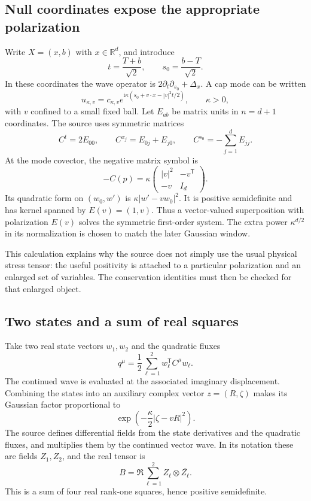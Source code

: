 \documentclass[11pt,a4paper]{article}
\numberwithin{equation}{section}
\theoremstyle{definition}
\theoremstyle{remark}
\newcommand{\R}{\mathbb R}
\begin{document}
\subsection{Null coordinates expose the appropriate polarization}
Write $X=(x,b)$ with $x\in\R^d$, and introduce
\[
 t=\frac{T+b}{\sqrt2},\qquad s_0=\frac{b-T}{\sqrt2}.
\]
In these coordinates the wave operator is
$2\partial_t\partial_{s_0}+\Delta_x$. A cap mode can be written
\[
 u_{\kappa,v}=c_{\kappa,v}
   e^{\mathrm i\kappa(s_0+v\cdot x-|v|^2t/2)},
 \qquad \kappa>0,
\]
with $v$ confined to a small fixed ball. Let $E_{ab}$ be matrix units in
$n=d+1$ coordinates. The source uses symmetric matrices
\[
 C^t=2E_{00},\qquad C^{x_j}=E_{0j}+E_{j0},\qquad
 C^{s_0}=-\sum_{j=1}^dE_{jj}.
\]
At the mode covector, the negative matrix symbol is
\begin{equation}\label{eq:symbol}
 -C(p)=\kappa
 \begin{pmatrix}|v|^2&-v^{\mathsf T}\\-v&I_d\end{pmatrix}.
\end{equation}
Its quadratic form on $(w_0,w')$ is
$\kappa|w'-vw_0|^2$. It is positive semidefinite and has kernel spanned by
$E(v)=(1,v)$. Thus a vector-valued superposition with polarization $E(v)$
solves the symmetric first-order system. The extra power $\kappa^{d/2}$ in
its normalization is chosen to match the later Gaussian window.

This calculation explains why the source does not simply use the usual
physical stress tensor: the useful positivity is attached to a particular
polarization and an enlarged set of variables. The conservation identities
must then be checked for that enlarged object.

\subsection{Two states and a sum of real squares}
Take two real state vectors $w_1,w_2$ and the quadratic fluxes
\[
 q^\mu=\frac12\sum_{\ell=1}^2 w_\ell^{\mathsf T}C^\mu w_\ell.
\]
The continued wave is evaluated at the associated imaginary displacement.
Combining the states into an auxiliary complex vector $z=(R,\zeta)$ makes
its Gaussian factor proportional to
\[
 \exp\left(-\frac\kappa2|\zeta-vR|^2\right).
\]
The source defines differential fields from the state derivatives and the
quadratic fluxes, and multiplies them by the continued vector wave. In its
notation these are fields $Z_1,Z_2$, and the real tensor is
\begin{equation}\label{eq:realcurrent}
 B=\Re\sum_{\ell=1}^2 Z_\ell\otimes\overline{Z_\ell}.
\end{equation}
This is a sum of four real rank-one squares, hence positive semidefinite.
\end{document}
